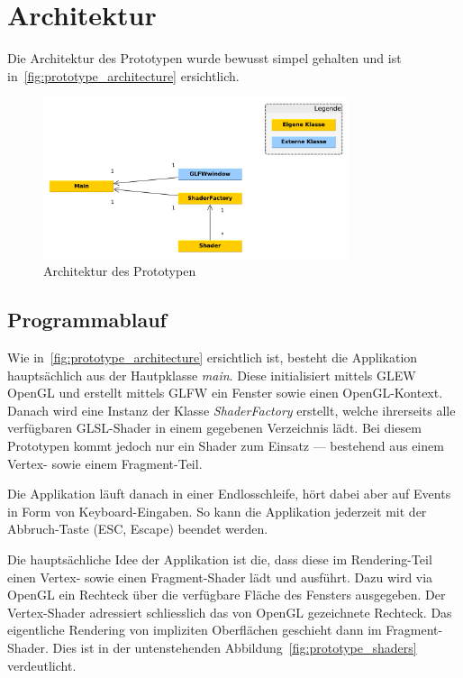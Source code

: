 \section{Architektur}
\label{sec:architecture}

Die Architektur des Prototypen wurde bewusst simpel gehalten und ist
in~\autoref{fig:prototype_architecture} ersichtlich.

\begin{figure}[H]
    \centering
    \includegraphics[width=0.8\textwidth]{img/prototype_class_diagram.pdf}
    \caption{Architektur des Prototypen\protect\footnotemark}\label{fig:prototype_architecture}
\end{figure}

\subsection{Programmablauf}
\label{subsec:program_sequence}

Wie in~\autoref{fig:prototype_architecture} ersichtlich ist, besteht die
Applikation hauptsächlich aus der Hautpklasse \textit{main}. Diese
initialisiert mittels GLEW OpenGL und erstellt mittels GLFW ein Fenster sowie
einen OpenGL-Kontext. Danach wird eine Instanz der Klasse
\textit{ShaderFactory} erstellt, welche ihrerseits alle verfügbaren GLSL-Shader
in einem gegebenen Verzeichnis lädt. Bei diesem Prototypen kommt jedoch nur ein
Shader zum Einsatz --- bestehend aus einem Vertex- sowie einem Fragment-Teil.

Die Applikation läuft danach in einer Endlosschleife, hört dabei aber
auf Events in Form von Keyboard-Eingaben. So kann die Applikation
jederzeit mit der Abbruch-Taste (ESC, Escape) beendet werden.

Die hauptsächliche Idee der Applikation ist die, dass diese im Rendering-Teil einen
Vertex- sowie einen Fragment-Shader lädt und ausführt. Dazu wird via OpenGL ein
Rechteck über die verfügbare Fläche des Fensters ausgegeben.  Der Vertex-Shader
adressiert schliesslich das von OpenGL gezeichnete Rechteck.  Das eigentliche
Rendering von impliziten Oberflächen geschieht dann im Fragment-Shader. Dies
ist in der untenstehenden Abbildung~\ref{fig:prototype_shaders} verdeutlicht.

